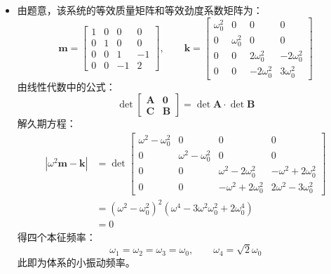 \documentclass[a4paper,fontset=windows]{ctexart}
\begin{document}
\begin{itemize}
        \item[3.5.(1)]
        由题意，该系统的等效质量矩阵和等效劲度系数矩阵为：
        \[
        \boldsymbol{m} =
        \begin{bmatrix}
            1 & 0 & 0 & 0 \\
            0 & 1 & 0 & 0 \\
            0 & 0 & 1 & -1 \\
            0 & 0 & -1 & 2
        \end{bmatrix},\qquad
        \boldsymbol{k} =
        \begin{bmatrix}
            \omega_0^2 & 0 & 0 & 0 \\
            0 & \omega_0^2 & 0 & 0 \\
            0 & 0 & 2\omega_0^2 & -2\omega_0^2 \\
            0 & 0 & -2\omega_0^2 & 3\omega_0^2
        \end{bmatrix}
        \]
        由线性代数中的公式：
        \[
        \det
        \begin{bmatrix}
            \boldsymbol{A} & \boldsymbol{0} \\
            \boldsymbol{C} & \boldsymbol{B}
        \end{bmatrix}
        =
        \det\boldsymbol{A}\cdot\det\boldsymbol{B}
        \]
        解久期方程：
        \begin{align*}
            \left|\omega^2\boldsymbol{m}- \boldsymbol{k}\right|
            &= \det
            \begin{bmatrix}
                \omega^2-\omega_0^2 & 0 & 0 & 0 \\
                0 & \omega^2-\omega_0^2 & 0 & 0 \\
                0 & 0 & \omega^2-2\omega_0^2 & -\omega^2+2\omega_0^2 \\
                0 & 0 & -\omega^2+2\omega_0^2 & 2\omega^2-3\omega_0^2
            \end{bmatrix} \\
            &= (\omega^2-\omega_0^2)^2(\omega^4-3\omega^2\omega_0^2+2\omega_0^4) \\
            &= 0
        \end{align*}
        得四个本征频率：
        \[
        \omega_1 = \omega_2 = \omega_3 = \omega_0,\qquad \omega_4 = \sqrt{2}\omega_0
        \]
        此即为体系的小振动频率。

    \end{itemize}
\end{document}
